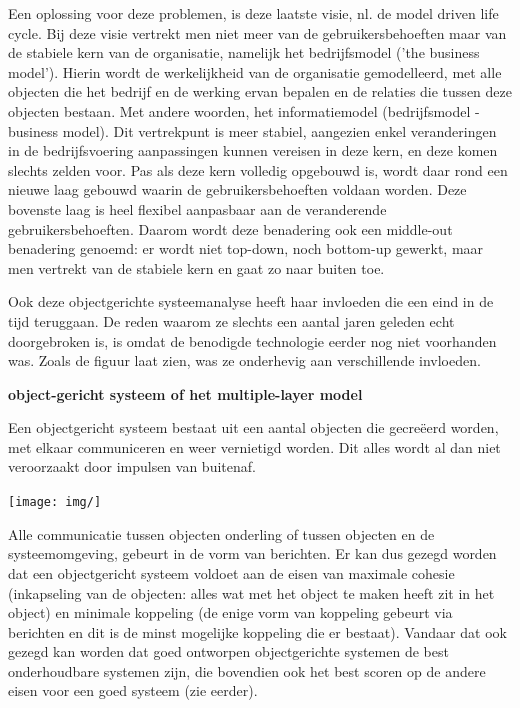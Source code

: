 Een oplossing voor deze problemen, is deze laatste visie, nl. de model driven life cycle. Bij deze visie vertrekt men niet meer van de gebruikersbehoeften maar van de stabiele kern van de organisatie, namelijk het bedrijfsmodel ('the business model'). Hierin wordt de werkelijkheid van de organisatie gemodelleerd, met alle objecten die het bedrijf en de werking ervan bepalen en de relaties die tussen deze objecten bestaan. Met andere woorden, het informatiemodel (bedrijfsmodel - business model). Dit vertrekpunt is meer stabiel, aangezien enkel veranderingen in de bedrijfsvoering aanpassingen kunnen vereisen in deze kern, en deze komen slechts zelden voor. Pas als deze kern volledig opgebouwd is, wordt daar rond een nieuwe laag gebouwd waarin de gebruikersbehoeften voldaan worden. Deze bovenste laag is heel flexibel aanpasbaar aan de veranderende gebruikersbehoeften. Daarom wordt deze benadering ook een middle-out benadering genoemd: er wordt niet top-down, noch bottom-up gewerkt, maar men vertrekt van de stabiele kern en gaat zo naar buiten toe.

Ook deze objectgerichte systeemanalyse heeft haar invloeden die een eind in de tijd teruggaan. De reden waarom ze slechts een aantal jaren geleden echt doorgebroken is, is omdat de benodigde technologie eerder nog niet voorhanden was. Zoals de figuur laat zien, was ze onderhevig aan verschillende invloeden.

\textbf{object-gericht systeem of het multiple-layer model}

Een objectgericht systeem bestaat uit een aantal objecten die gecreëerd worden, met elkaar communiceren en weer vernietigd worden. Dit alles wordt al dan niet veroorzaakt door impulsen van buitenaf.


\begin{center}
\texttt{[image: img/]}%
\label{labelname}%
\end{center}

Alle communicatie tussen objecten onderling of tussen objecten en de systeemomgeving, gebeurt in de vorm van berichten. Er kan dus gezegd worden dat een objectgericht systeem voldoet aan de eisen van maximale cohesie (inkapseling van de objecten: alles wat met het object te maken heeft zit in het object) en minimale koppeling (de enige vorm van koppeling gebeurt via berichten en dit is de minst mogelijke koppeling die er bestaat). Vandaar dat ook gezegd kan worden dat goed ontworpen objectgerichte systemen de best onderhoudbare systemen zijn, die bovendien ook het best scoren op de andere eisen voor een goed systeem (zie eerder).

